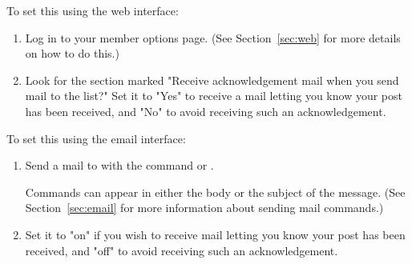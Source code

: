 \documentclass{howto}
\begin{document}
To set this using the web interface:
\begin{enumerate}
	\item Log in to your member options page.  (See Section~\ref{sec:web} 
	for more details on how to do this.)
	\item Look for the section marked "Receive acknowledgement mail when you
	send mail to the list?"  
	Set it to "Yes" to receive a mail letting you know your post has been
	received, and  "No" to avoid receiving such an acknowledgement.
\end{enumerate}

To set this using the email interface:
\begin{enumerate}
   \item Send a mail to  with the command
    or .

   Commands can appear
   in either the body or the subject of the message.  (See
   Section~\ref{sec:email} for more information about sending mail
   commands.)
	\item Set it to "on" if you wish to receive mail letting you know your 
	post has been received, and  "off" to avoid receiving such an 
	acknowledgement.
\end{enumerate}

\end{document}
